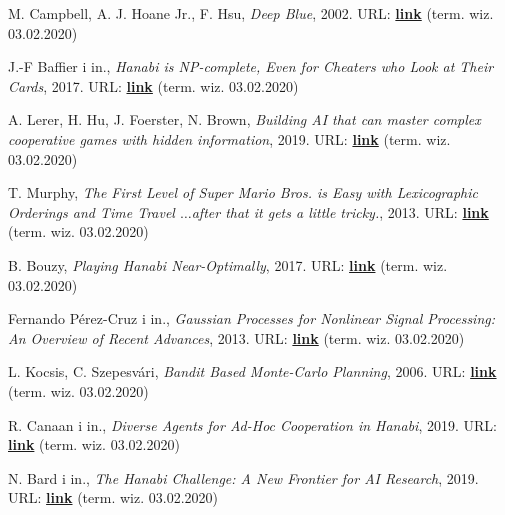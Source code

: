 \documentclass[declaration,shortabstract,inz]{iithesis}
\begin{document}
\begin{thebibliography}{4}

 M. Campbell, A. J. Hoane Jr., F. Hsu, \textit{Deep Blue}, 2002. URL: 
\href{https://core.ac.uk/download/pdf/82416379.pdf}{\textbf{link}} (term. wiz. 03.02.2020)

 J.-F Baffier i in., \textit{Hanabi is NP-complete, Even for Cheaters who Look at Their Cards}, 2017. URL: 
\href{https://arxiv.org/pdf/1603.01911.pdf}{\textbf{link}} (term. wiz. 03.02.2020)

 A. Lerer, H. Hu, J. Foerster, N. Brown, \textit{Building AI that can master complex cooperative games with hidden information}, 2019. URL: 
\href{https://ai.facebook.com/blog/building-ai-that-can-master-complex-cooperative-games-with-hidden-information/}{\textbf{link}} (term. wiz. 03.02.2020)

 T. Murphy, \textit{The First Level of Super Mario Bros. is Easy with Lexicographic Orderings and Time Travel $\ldots$after that it gets a little tricky.}, 2013. URL: 
\href{http://www.cs.cmu.edu/~tom7/mario/mario.pdf}{\textbf{link}} (term. wiz. 03.02.2020)

 B. Bouzy, \textit{Playing Hanabi Near-Optimally}, 2017. URL: 
\href{http://helios.mi.parisdescartes.fr/~bouzy/publications/bouzy-hanabi-2017.pdf}{\textbf{link}} (term. wiz. 03.02.2020)

 Fernando Pérez-Cruz i in., \textit{Gaussian Processes for Nonlinear Signal Processing: An Overview of Recent Advances}, 2013. URL: 
\href{https://www.researchgate.net/publication/260637079_Gaussian_Processes_for_Nonlinear_Signal_Processing_An_Overview_of_Recent_Advances}{\textbf{link}} (term. wiz. 03.02.2020)

 L. Kocsis, C. Szepesvári, \textit{Bandit Based Monte-Carlo Planning}, 2006. URL: 
\href{https://link.springer.com/content/pdf/10.1007/11871842_29.pdf}{\textbf{link}} (term. wiz. 03.02.2020)

 R. Canaan i in., \textit{Diverse Agents for Ad-Hoc Cooperation in Hanabi}, 2019. URL: 
\href{https://arxiv.org/pdf/1907.03840.pdf}{\textbf{link}} (term. wiz. 03.02.2020)

 N. Bard i in., \textit{The Hanabi Challenge: A New Frontier for AI Research}, 2019. URL: 
\href{https://arxiv.org/pdf/1902.00506.pdf}{\textbf{link}} (term. wiz. 03.02.2020)

\end{thebibliography}
\end{document}
